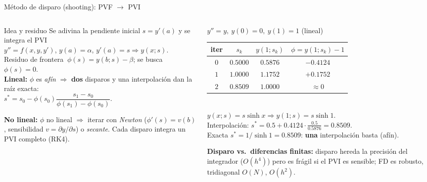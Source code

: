\documentclass[aspectratio=169,10pt]{beamer}
\begin{document}
\begin{frame}{Método de disparo (shooting): PVF $\to$ PVI}
\begin{columns}[T]
\begin{column}{0.47\textwidth}
\begin{cardidea}{Idea y residuo}{\faSuperscript}
{\footnotesize Se adivina la pendiente inicial $s=y'(a)$ y se integra el PVI\\[0.2mm]
$y''=f(x,y,y')$, $y(a)=\alpha$, $y'(a)=s\Rightarrow y(x;s)$.\\[0.8mm]
Residuo de frontera $\ \phi(s)=y(b;s)-\beta$; se busca $\phi(s)=0$.\\[0.8mm]
\textbf{Lineal:} $\phi$ es \emph{afín} $\Rightarrow$ \textbf{dos} disparos y una interpolación dan la raíz exacta:\\[0.2mm]
$s^*=s_0-\phi(s_0)\dfrac{s_1-s_0}{\phi(s_1)-\phi(s_0)}$.}
\end{cardidea}
\vspace{1mm}
\begin{cardnota}[\faInfoCircle]
{\footnotesize \textbf{No lineal:} $\phi$ no lineal $\Rightarrow$ iterar con \emph{Newton} ($\phi'(s)=v(b)$, sensibilidad $v=\partial y/\partial s$) o \emph{secante}. Cada disparo integra un PVI completo (RK4).}
\end{cardnota}
\end{column}
\begin{column}{0.51\textwidth}
\begin{cardgear}{$y''=y,\ y(0)=0,\ y(1)=1$ (lineal)}{\faTable}
\centering
{\footnotesize\renewcommand{\arraystretch}{1.35}\setlength{\tabcolsep}{7pt}
\begin{tabular}{c|c|c|c}
iter & $s_k$ & $y(1;s_k)$ & $\phi=y(1;s_k)-1$\\\hline
$0$ & $0.5000$ & $0.5876$ & $-0.4124$\\
$1$ & $1.0000$ & $1.1752$ & $+0.1752$\\
$2$ & $0.8509$ & $1.0000$ & $\approx0$\\
\end{tabular}}\\[1.2mm]
{\footnotesize $y(x;s)=s\sinh x\Rightarrow y(1;s)=s\sinh1$.\\[0.3mm]
Interpolación: $s^*=0.5+0.4124\cdot\tfrac{0.5}{0.5876}=0.8509$.\\[0.3mm]
Exacta $s^*=1/\sinh1=0.8509$: \textbf{una} interpolación basta (afín).}
\end{cardgear}
\vspace{1mm}
\begin{cardnota}[\faInfoCircle]
{\footnotesize \textbf{Disparo vs.\ diferencias finitas:} disparo hereda la precisión del integrador ($O(h^4)$) pero es frágil si el PVI es sensible; FD es robusto, tridiagonal $O(N)$, $O(h^2)$.}
\end{cardnota}
\end{column}
\end{columns}
\end{frame}
\end{document}
